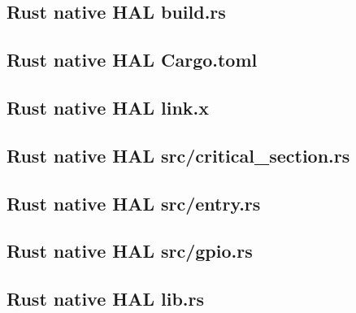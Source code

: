 

\subsection{Rust native HAL build.rs}
\label{sec:appendix:code:hal:build}



\subsection{Rust native HAL Cargo.toml}
\label{sec:appendix:code:hal:cargo}



\subsection{Rust native HAL link.x}
\label{sec:appendix:code:hal:link}



\subsection{Rust native HAL src/critical\_section.rs}
\label{sec:appendix:code:hal:critical_section}



\subsection{Rust native HAL src/entry.rs}
\label{sec:appendix:code:hal:entry}



\subsection{Rust native HAL src/gpio.rs}
\label{sec:appendix:code:hal:gpio}



\subsection{Rust native HAL lib.rs}
\label{sec:appendix:code:hal:lib}

